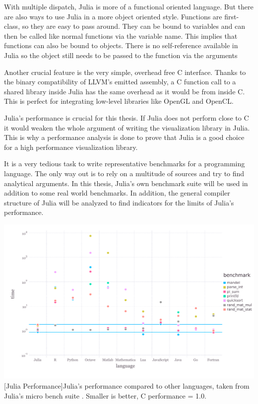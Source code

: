 With multiple dispatch, Julia is more of a functional oriented language. 
But there are also ways to use Julia in a more object oriented style.
Functions are first-class, so they are easy to pass around. 
They can be bound to variables and can then be called like normal functions via the variable name. This implies that functions can also be bound to objects.
There is no self-reference available in Julia so the object still needs to be passed to the function via the arguments

Another crucial feature is the very simple, overhead free C interface. 
Thanks to the binary compatibility of \ac{LLVM}'s emitted assembly, a C function call to a shared library inside Julia has the same overhead as it would be from inside C\cite{CCALL}. 
This is perfect for integrating low-level libraries like \ac{OpenGL} and \ac{OpenCL}.

Julia's performance is crucial for this thesis. 
If Julia does not perform close to C it would weaken the whole argument of writing the visualization library in Julia.
This is why a performance analysis is done to prove that Julia is a good choice for a high performance visualization library.

It is a very tedious task to write representative benchmarks for a programming language. 
The only way out is to rely on a multitude of sources and try to find analytical arguments.
In this thesis, Julia's own benchmark suite will be used in addition to some real world benchmarks.
In addition, the general compiler structure of Julia will be analyzed to find indicators for the limits of Julia's performance.

\vspace{1em}
\begin{minipage}{\linewidth}
    \centering
    \includegraphics[width=0.9\linewidth]{graphics/juliabench.pdf}
    [Julia Performance]{Julia's performance compared to other languages, taken from Julia's micro bench suite \cite{JuliaBench}. Smaller is better, C performance = 1.0.}
    \label{fig:juliabench}
\end{minipage}

